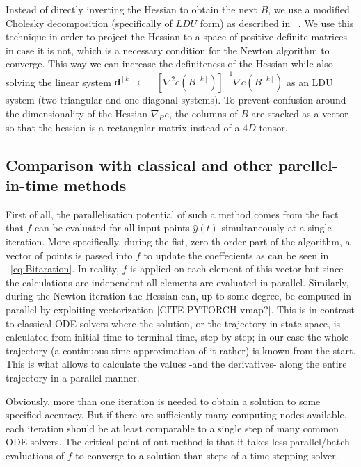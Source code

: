 \documentclass[11pt]{article}
\begin{document}
    Instead of directly inverting the Hessian to obtain the next $B$, we use a modified Cholesky decomposition
    (specifically of $LDU$ form) as described in ~\cite{gill2019practical}.
    We use this technique in order to project the Hessian to a space of positive definite matrices in case it is not,
    which is a necessary condition for the Newton algorithm to converge.
    This way we can increase the definiteness of the Hessian while also solving the linear system
    $\pmb{d}^{[k]} \gets -\left[ \nabla^2 e(B^{[k]}) \right]^{-1} \nabla e(B^{[k]})$ as an LDU system (two triangular
    and one diagonal systems).
    To prevent confusion around the dimensionality of the Hessian $\nabla_{B} e$,
    the columns of $B$ are stacked as a vector so that the hessian is a rectangular matrix instead of a $4D$ tensor.

    \subsection{Comparison with classical and other parellel-in-time methods}
    First of all, the parallelisation potential of such a method comes from the fact that $f$ can be evaluated for all
    input points $\hat y(t)$ simultaneously at a single iteration.
    More specifically, during the fist, zero-th order part of the algorithm, a vector of points is passed into $f$ to
    update the coeffecients as can be seen in ~\eqref{eq:Bitaration}.
    In reality, $f$ is applied on each element of this vector but since the calculations are independent all elements are
    evaluated in parallel.
    Similarly, during the Newton iteration the Hessian can, up to some degree, be computed in parallel by exploiting
    vectorization [CITE PYTORCH vmap?].
    This is in contrast to classical ODE solvers where the solution, or the trajectory in state space, is calculated from
    initial time to terminal time, step by step; in our case the whole trajectory (a continuous time approximation
    of it rather) is known from the start.
    This is what allows to calculate the values -and the derivatives- along the entire trajectory in a parallel manner.

    Obviously, more than one iteration is needed to obtain a solution to some specified accuracy.
    But if there are sufficiently many computing nodes available, each iteration should be at least comparable to a
    single step of many common ODE solvers.
    The critical point of out method is that it takes less parallel/batch evaluations of $f$ to converge to a solution
    than steps of a time stepping solver.
\end{document}
